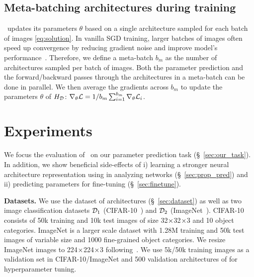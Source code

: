 \subsection{Meta-batching architectures during training\label{sec:meta_batch}}

\ghnbase~updates its parameters $\theta$ based on a single architecture sampled for each batch of images \eqref{eq:solution}.
In vanilla SGD training, larger batches of images often speed up convergence by reducing gradient noise and improve model's performance~\citep{radiuk2017impact}. Therefore, we define a meta-batch $b_m$ as the number of architectures sampled per batch of images. Both the parameter prediction and the forward/backward passes through the architectures in a meta-batch can be done in parallel. We then average the gradients across $b_m$ to update the parameters $\theta$ of $H_{\mathcal{D}}$: $\nabla_\theta {\cal L} = 1/{b_m} \sum_{i=1}^{b_m} \nabla_\theta {\cal L}_i$. 

\section{Experiments\label{sec:ghn_exper}}

We focus the evaluation of \ghnours~on our parameter prediction task (\S~\ref{sec:our_task}). In addition, we show beneficial side-effects of i) learning a stronger neural architecture representation using \ghnours in analyzing networks (\S~\ref{sec:prop_pred}) and ii) predicting parameters for fine-tuning (\S~\ref{sec:finetune}). 

\textbf{Datasets.} We use the \dataset dataset of architectures (\S~\ref{sec:dataset}) as well as two image classification datasets  $\mathcal{D}_1$ (CIFAR-10~\citep{krizhevsky2009learning}) and $\mathcal{D}_2$ (ImageNet~\citep{russakovsky2015imagenet}). CIFAR-10 consists of 50k training and 10k test images of size 32${\mkern-0.1mu\times\mkern-0.1mu}$32${\mkern-0.1mu\times\mkern-0.1mu}$3 and 10 object categories.
ImageNet is a larger scale dataset with 1.28M training and 50k test images of variable size and 1000 fine-grained object categories. We resize ImageNet images to 224${\mkern-0.1mu\times\mkern-0.1mu}$224${\mkern-0.1mu\times\mkern-0.1mu}$3 following~\citep{liu2018darts,zhang2018graph}. We use 5k/50k training images as a validation set in CIFAR-10/ImageNet and 500 validation architectures of \dataset for hyperparameter tuning.

